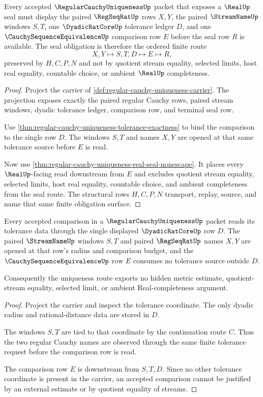 \begin{theorem}
\label{thm:regular-cauchy-uniqueness-seal-obligations}
Every accepted $\RegularCauchyUniquenessUp$ packet that exposes a $\RealUp$ seal must display the paired $\RegSeqRatUp$ rows $X,Y$, the paired $\StreamNameUp$ windows $S,T$, one $\DyadicRatCoreUp$ tolerance ledger $D$, and one $\CauchySequenceEquivalenceUp$ comparison row $E$ before the seal row $R$ is available. The seal obligation is therefore the ordered finite route
$$
X,Y \longmapsto S,T,D \longmapsto E \longmapsto R ,
$$
preserved by $H,C,P,N$ and not by quotient stream equality, selected limits, host real equality, countable choice, or ambient $\RealUp$ completeness.
\end{theorem}
\begin{proof}
Project the carrier of \autoref{def:regular-cauchy-uniqueness-carrier}. The projection exposes exactly the paired regular Cauchy rows, paired stream windows, dyadic tolerance ledger, comparison row, and terminal seal row.

Use \autoref{thm:regular-cauchy-uniqueness-tolerance-exactness} to bind the comparison to the single row $D$. The windows $S,T$ and names $X,Y$ are opened at that same tolerance source before $E$ is read.

Now use \autoref{thm:regular-cauchy-uniqueness-real-seal-nonescape}. It places every $\RealUp$-facing read downstream from $E$ and excludes quotient stream equality, selected limits, host real equality, countable choice, and ambient completeness from the seal route. The structural rows $H,C,P,N$ transport, replay, source, and name that same finite obligation surface.
\end{proof}

\begin{theorem}
\label{thm:regular-cauchy-uniqueness-tolerance-exactness}
Every accepted comparison in a $\RegularCauchyUniquenessUp$ packet reads its tolerance data through the single displayed $\DyadicRatCoreUp$ row $D$. The paired $\StreamNameUp$ windows $S,T$ and paired $\RegSeqRatUp$ names $X,Y$ are opened at that row's radius and comparison budget, and the $\CauchySequenceEquivalenceUp$ row $E$ consumes no tolerance source outside $D$.

Consequently the uniqueness route exports no hidden metric estimate, quotient-stream equality, selected limit, or ambient Real-completeness argument.
\end{theorem}
\begin{proof}
Project the carrier and inspect the tolerance coordinate. The only dyadic radius and rational-distance data are stored in $D$.

The windows $S,T$ are tied to that coordinate by the continuation route $C$. Thus the two regular Cauchy names are observed through the same finite tolerance request before the comparison row is read.

The comparison row $E$ is downstream from $S,T,D$. Since no other tolerance coordinate is present in the carrier, an accepted comparison cannot be justified by an external estimate or by quotient equality of streams.
\end{proof}

